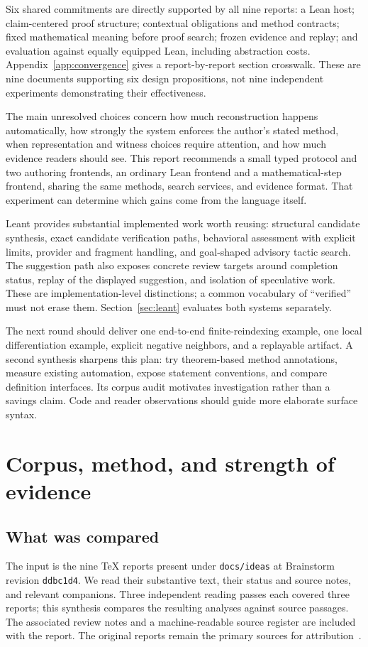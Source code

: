 \documentclass[11pt,letterpaper]{article}
\newcommand{\code}[1]{\nolinkurl{#1}}
\begin{document}
Six shared commitments are directly supported by all nine reports: a Lean host;
claim-centered proof structure; contextual obligations and method contracts;
fixed mathematical meaning before proof search; frozen evidence and replay;
and evaluation against equally equipped Lean, including abstraction costs.
Appendix~\ref{app:convergence} gives a report-by-report section crosswalk.
These are nine documents supporting six design propositions, not nine independent
experiments demonstrating their effectiveness.

The main unresolved choices concern how much reconstruction happens automatically,
how strongly the system enforces the author's stated method, when representation
and witness choices require attention, and how much evidence readers should see.
This report recommends a small typed protocol and two authoring frontends, an
ordinary Lean frontend and a mathematical-step frontend, sharing the same methods,
search services, and evidence format. That experiment can determine which gains
come from the language itself.

Leant provides substantial implemented work worth reusing: structural candidate
synthesis, exact candidate verification paths, behavioral assessment with explicit
limits, provider and fragment handling, and goal-shaped advisory tactic search.
The suggestion path also exposes concrete review targets around completion status,
replay of the displayed suggestion, and isolation of speculative work. These are
implementation-level distinctions; a common vocabulary of ``verified'' must not
erase them. Section~\ref{sec:leant} evaluates both systems separately.

The next round should deliver one end-to-end finite-reindexing example, one local
differentiation example, explicit negative neighbors, and a replayable artifact.
A second synthesis sharpens this plan: try theorem-based method annotations,
measure existing automation, expose statement conventions, and compare definition
interfaces. Its corpus audit motivates investigation rather than a savings claim.
Code and reader observations should guide more elaborate surface syntax.

\clearpage
\tableofcontents
\clearpage

\section{Corpus, method, and strength of evidence}\label{sec:method}
\subsection{What was compared}
The input is the nine TeX reports present under \code{docs/ideas} at Brainstorm
revision \code{ddbc1d4}. We read their substantive text, their status and source
notes, and relevant companions. Three independent reading passes each covered
three reports; this synthesis compares the resulting analyses against source
passages. The associated review notes and a machine-readable source register
are included with the report. The original reports remain the primary sources
for attribution~\cite{contour,loom,mathstep,mpl,mosaic,motive,outline,reason,spine}.
\end{document}
